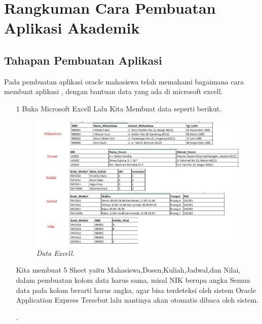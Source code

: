 \chapter{Rangkuman Cara Pembuatan Aplikasi Akademik}

\section{Tahapan Pembuatan Aplikasi}
Pada pembuatan aplikasi oracle mahasiswa telah memahami bagaimana cara membuat aplikasi , dengan bantuan data yang ada di microsoft excell.

\begin{enumerate}
\item[1]Buka Microsoft Excell Lalu Kita Membuat data seperti berikut.

\begin{figure}[!htbp]
    \begin{center}
    \includegraphics[scale=0.6]{figures/exc.jpg}
    \caption{\textit{Data Excell.}}
    \end{center}   
    \end{figure}
    \par Kita membuat 5 Sheet yaitu Mahasiswa,Dosen,Kuliah,Jadwal,dan Nilai, dalam pembuatan kolom data harus sama, misal NIK berupa angka Semua data pada kolom berarti harus angka, agar bisa terdeteksi oleh sistem Oracle Application Express Tersebut lalu nantinya akan otomatis dibaca oleh sistem.
    \par.


\end{enumerate}
